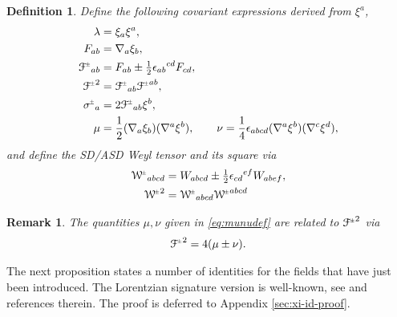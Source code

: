 \documentclass[a4paper,10pt,reqno]{amsart}
\theoremstyle{plain}
\newtheorem{definition}[thm]{Definition}
\newtheorem{remark}[thm]{Remark}
\newcommand{\PM}[1]{{{#1}^{\hspace{-.5pt}\scaleto{\pm}{3.5pt}}}}
\def\Wcal{\mathcal{W}}
\def\Fcal{\mathcal{F}}
\numberwithin{equation}{section}
\begin{document}
\begin{definition}
Define the following covariant expressions derived from $\xi^{a}$,
\begin{subequations} \label{eq:concomitants} 
\begin{align}
\lambda  ={}& \xi_{a} \xi^{a}, \label{def:lambda} \\
F_{ab}={}&\nabla_{a}\xi_{b}, \label{def:F_ab} \\
\PM{\Fcal}_{ab}={}&F_{ab} \pm \tfrac{1}{2} \epsilon_{ab}{}^{cd} F_{cd}, \label{def:Fcal_ab}\\
\PM{\Fcal}^2={}&\PM{\Fcal}_{ab} \PM{\Fcal}^{ab}, \label{def:Fcal2} \\
\PM{\sigma}_{a}={}&2 \PM{\Fcal}_{ab} \xi^{b}, \label{def:sigmaa} \\
\mu ={}& \frac{1}{2}(\nabla_a\xi_b)(\nabla^a\xi^b), \qquad
\nu = \frac{1}{4}\epsilon_{abcd}(\nabla^a\xi^b)(\nabla^c\xi^d), \label{eq:munudef}
\end{align}
\end{subequations}
and define the SD/ASD Weyl tensor and its square via
\begin{align}
\PM{\Wcal}_{abcd} ={}& W_{abcd} \pm \tfrac{1}{2} \epsilon_{cd}{}^{ef} W_{abef}, \\
 \PM{\Wcal}^2 ={}& \PM{\Wcal}_{abcd}\PM{\Wcal}^{abcd} 
\end{align}
\end{definition} 
\begin{remark} 
The quantities $\mu, \nu$ given in \eqref{eq:munudef} are related to $\PM{\Fcal}^2$ via 
\begin{align}\label{eq:F2munu}
\PM{\Fcal}^2 = 4(\mu \pm \nu).
\end{align}
\end{remark}

The next proposition states a number of identities for the fields that have just been introduced. The Lorentzian signature version  is well-known, see \cite{Mars:2000:MR1779516} and references therein. The proof is deferred to Appendix \ref{sec:xi-id-proof}.
\end{document}
